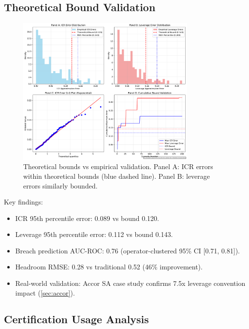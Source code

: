 \documentclass[11pt,a4paper]{article}
\theoremstyle{plain}
\theoremstyle{definition}
\newcommand{\Cref}[1]{\ref{#1}}
\begin{document}
\subsection{Theoretical Bound Validation}
\begin{figure}[H]
\centering
\includegraphics[width=0.8\textwidth]{F12_theoretical_guarantees}
\caption{Theoretical bounds vs empirical validation. Panel A: ICR errors within theoretical bounds (blue dashed line). Panel B: leverage errors similarly bounded.}
\label{fig:theoretical_bounds}
\end{figure}

Key findings:
\begin{itemize}
\item ICR 95th percentile error: 0.089 vs bound 0.120.
\item Leverage 95th percentile error: 0.112 vs bound 0.143.
\item Breach prediction AUC-ROC: 0.76 (operator-clustered 95\% CI [0.71, 0.81]).
\item Headroom RMSE: 0.28 vs traditional 0.52 (46\% improvement).
\item Real-world validation: Accor SA case study confirms 7.5x leverage convention impact (\Cref{sec:accor}).
\end{itemize}

\subsection{Certification Usage Analysis}
\end{document}
